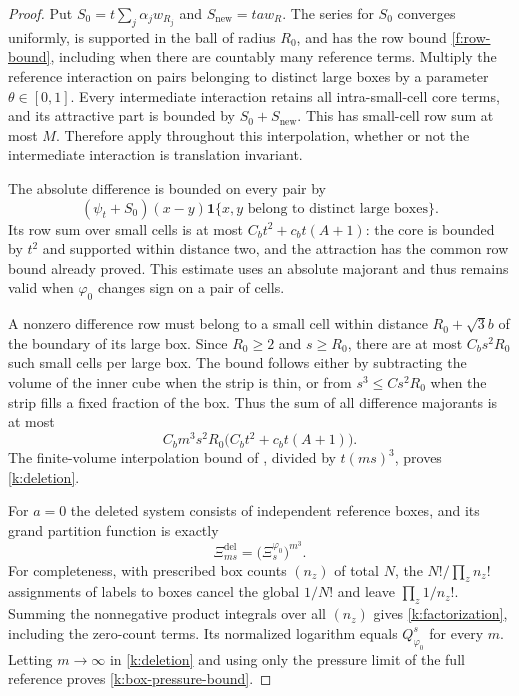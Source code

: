 \begin{proof}
Put $S_0=t\sum_j\alpha_jw_{R_j}$ and $S_{\mathrm{new}}=ta w_R$.
The series for $S_0$ converges uniformly, is supported in the ball of
radius $R_0$, and has the row bound \eqref{f:row-bound}, including when
there are countably many reference terms.
Multiply the reference interaction on pairs belonging to distinct large
boxes by a parameter $\theta\in[0,1]$.  Every intermediate interaction
retains all intra-small-cell core terms, and its attractive part is
bounded by $S_0+S_{\mathrm{new}}$.  This has small-cell row sum at most
$M$.  Therefore  apply throughout this
interpolation, whether or not the intermediate interaction is translation
invariant.

The absolute difference is bounded on every pair by
\[
 (\psi_t+S_0)(x-y)
 \boldsymbol 1\{x,y\text{ belong to distinct large boxes}\}.
\]
Its row sum over small cells is at most
$C_b t^2+c_b t(A+1)$: the core is bounded by $t^2$ and supported within
distance two, and the attraction has the common row bound already proved.
This estimate uses an absolute majorant and thus remains valid when
$\varphi_0$ changes sign on a pair of cells.

A nonzero difference row must belong to a small cell within distance
$R_0+\sqrt3 b$ of the boundary of its large box.  Since $R_0\ge2$ and
$s\ge R_0$, there are at most $C_b s^2R_0$ such small cells per large
box.  The bound follows either by subtracting the volume of the inner
cube when the strip is thin, or from $s^3\le C s^2R_0$ when the strip
fills a fixed fraction of the box.  Thus the sum of all difference
majorants is at most
\[
 C_b m^3s^2R_0\bigl(C_b t^2+c_b t(A+1)\bigr).
\]
The finite-volume interpolation bound of , divided
by $t(ms)^3$, proves \eqref{k:deletion}.

For $a=0$ the deleted system consists of independent reference boxes,
and its grand partition function is exactly
\begin{equation}
 \Xi^{\mathrm{del}}_{ms}
       =\bigl(\Xi_s^{\varphi_0}\bigr)^{m^3}.
 \label{k:factorization}
\end{equation}
For completeness, with prescribed box counts $(n_z)$ of total $N$, the
$N!/\prod_z n_z!$ assignments of labels to boxes cancel the global
$1/N!$ and leave $\prod_z1/n_z!$.  Summing the nonnegative product
integrals over all $(n_z)$ gives \eqref{k:factorization}, including
the zero-count terms.  Its normalized logarithm equals
$Q^s_{\varphi_0}$ for every $m$.  Letting $m\to\infty$ in
\eqref{k:deletion} and using only the pressure limit of the full
reference proves \eqref{k:box-pressure-bound}.
\end{proof}

